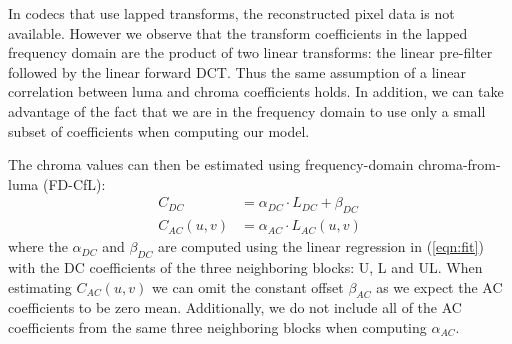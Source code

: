 \documentclass[a4paper]{spie}  %
\begin{document}
In codecs that use lapped transforms, the reconstructed pixel data is not
 available.
However we observe that the transform coefficients in the lapped frequency
 domain are the product of two linear transforms: the linear pre-filter
 followed by the linear forward DCT.
Thus the same assumption of a linear correlation between luma and chroma
 coefficients holds.
In addition, we can take advantage of the fact that we are in the frequency
 domain to use only a small subset of coefficients when computing our model.

The chroma values can then be estimated using frequency-domain chroma-from-luma
 (FD-CfL):
\begin{align*}
C_{DC} &= \alpha_{DC}\cdot L_{DC} + \beta_{DC} \\
C_{AC}(u,v) &= \alpha_{AC}\cdot L_{AC}(u,v)
\end{align*}
where the $\alpha_{DC}$ and $\beta_{DC}$ are computed using the linear
 regression in (\ref{eqn:fit}) with the DC coefficients of the three
 neighboring blocks: U, L and UL.
When estimating $C_{AC}(u,v)$ we can omit the constant offset $\beta_{AC}$
 as we expect the AC coefficients to be zero mean.
Additionally, we do not include all of the AC coefficients from the same three
 neighboring blocks when computing $\alpha_{AC}$.
\end{document}

